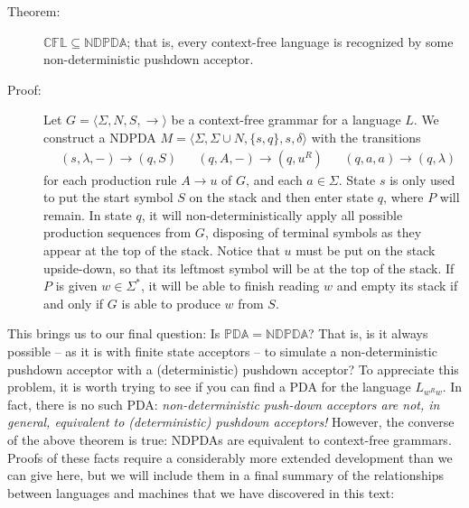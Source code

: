 \documentclass{article}
\begin{document}
\begin{description}

\item[Theorem:] $\mathbb{CFL} \subseteq \mathbb{NDPDA}$; that is, every context-free language is recognized by some non-deterministic pushdown acceptor.

\item[Proof:] Let $G = \langle \Sigma, N, S, \to \rangle$ be a context-free grammar for a language $L$. We construct a NDPDA $M = \langle \Sigma, \Sigma \cup N, \{s,q\}, s, \delta \rangle$ with the transitions
  \begin{align*}
  & (s,\lambda,-) \to (q,S) & & (q,A,-) \to (q,u^R) & & (q,a,a) \to (q,\lambda)
  \end{align*}
  for each production rule $A \to u$ of $G$, and each $a \in \Sigma$. State $s$ is only used to put the start symbol $S$ on the stack and then enter state $q$, where $P$ will remain. In state $q$, it will non-deterministically apply all possible production sequences from $G$, disposing of terminal symbols as they appear at the top of the stack. Notice that $u$ must be put on the stack upside-down, so that its leftmost symbol will be at the top of the stack. If $P$ is given $w \in \Sigma^*$, it will be able to finish reading $w$ and empty its stack if and only if $G$ is able to produce $w$ from $S$.

\end{description}

This brings us to our final question: Is $\mathbb{PDA} = \mathbb{NDPDA}$? That is, is it always possible -- as it is with finite state acceptors -- to simulate a non-deterministic pushdown acceptor with a (deterministic) pushdown acceptor? To appreciate this problem, it is worth trying to see if you can find a PDA for the language $L_{w^Rw}$. In fact, there is no such PDA: \emph{non-deterministic push-down acceptors are not, in general, equivalent to (deterministic) pushdown acceptors!} However, the converse of the above theorem is true: NDPDAs are equivalent to context-free grammars. Proofs of these facts require a considerably more extended development than we can give here, but we will include them in a final summary of the relationships between languages and machines that we have discovered in this text:
\begin{center}
\end{center}
\end{document}
